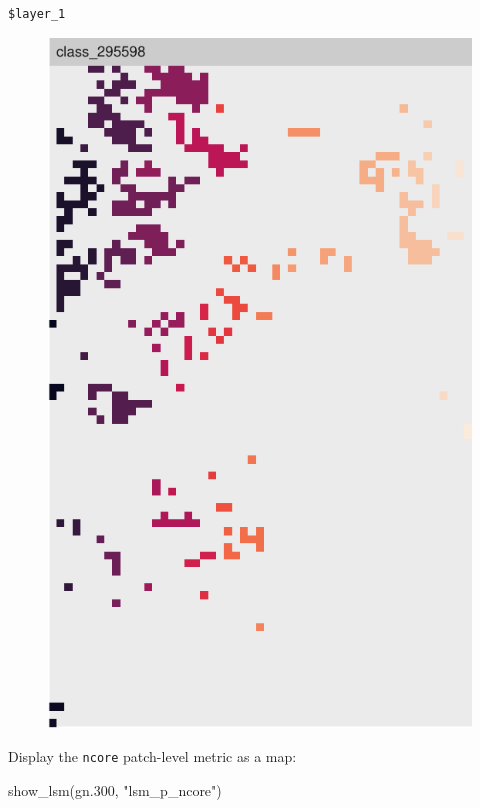 \documentclass[
  letterpaper,
  DIV=11,
  numbers=noendperiod]{scrartcl}
\newenvironment{Shaded}{\begin{snugshade}}{\end{snugshade}}
\newcommand{\FloatTok}[1]{\textcolor[rgb]{0.68,0.00,0.00}{#1}}
\newcommand{\FunctionTok}[1]{\textcolor[rgb]{0.28,0.35,0.67}{#1}}
\newcommand{\NormalTok}[1]{\textcolor[rgb]{0.00,0.23,0.31}{#1}}
\newcommand{\StringTok}[1]{\textcolor[rgb]{0.13,0.47,0.30}{#1}}
\begin{document}
\begin{verbatim}
$layer_1
\end{verbatim}

\begin{figure}[H]

{\centering \includegraphics{PatternAnalysisWorkshopTutorial_files/figure-pdf/show-patches-Erie-300-1.pdf}

}

\end{figure}

Display the \texttt{ncore} patch-level metric as a map:

\begin{Shaded}
\begin{Highlighting}[]
\FunctionTok{show\_lsm}\NormalTok{(gn}\FloatTok{.300}\NormalTok{, }\StringTok{"lsm\_p\_ncore"}\NormalTok{)}
\end{Highlighting}
\end{Shaded}
\end{document}
